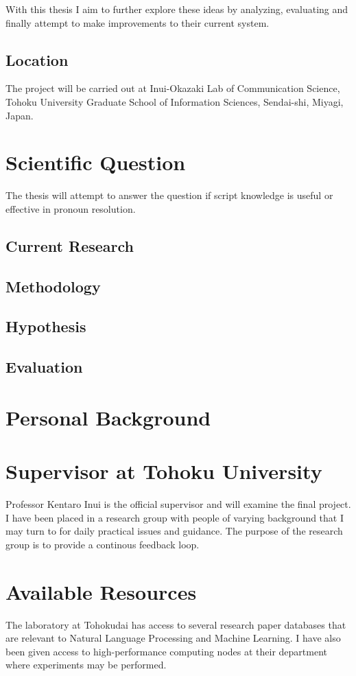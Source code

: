 \documentclass{article}
\begin{document}
With this thesis I aim to further explore these ideas by analyzing, evaluating and finally attempt to make improvements to their current system.
\subsection{Location}
The project will be carried out at Inui-Okazaki Lab of Communication Science, Tohoku University Graduate School of Information Sciences, Sendai-shi, Miyagi, Japan.

\section{Scientific Question}
The thesis will attempt to answer the question if script knowledge is useful or effective in pronoun resolution.
\subsection{Current Research}

\subsection{Methodology}

\subsection{Hypothesis}

\subsection{Evaluation}

\section{Personal Background}

\section{Supervisor at Tohoku University}
Professor Kentaro Inui is the official supervisor and will examine the final project. I have been placed in a research group with people of varying background that I may turn to for daily practical issues and guidance. The purpose of the research group is to provide a continous feedback loop.

\section{Available Resources}
The laboratory at Tohokudai has access to several research paper databases that are relevant to Natural Language Processing and Machine Learning. I have also been given access to high-performance computing nodes at their department where experiments may be performed.
\end{document}
